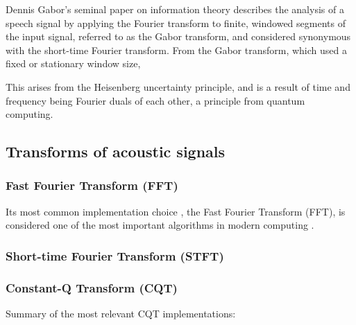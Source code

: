 \documentclass[report.tex]{subfiles}
\begin{document}
Dennis Gabor's seminal paper on information theory describes the analysis of a speech signal by applying the Fourier transform to finite, windowed segments of the input signal, referred to as the Gabor transform, and considered synonymous with the short-time Fourier transform. From the Gabor transform, which used a fixed or stationary window size, 

This arises from the Heisenberg uncertainty principle, and is a result of time and frequency being Fourier duals of each other, a principle from quantum computing.

\subsection{Transforms of acoustic signals}




\subsubsection{Fast Fourier Transform (FFT)}

Its most common implementation choice , the Fast Fourier Transform (FFT), is considered one of the most important algorithms in modern computing .

\subsubsection{Short-time Fourier Transform (STFT)}

\subsubsection{Constant-Q Transform (CQT)}


Summary of the most relevant CQT implementations:
\end{document}
